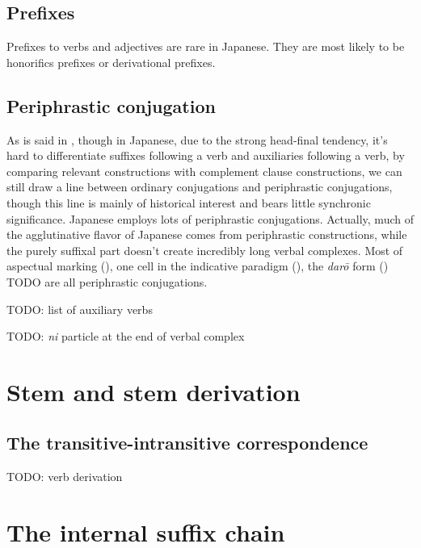 \documentclass[UTF8, a4paper, oneside, scheme=plain]{ctexrep}
\newcommand{\corpus}[1]{\emph{#1}}
\begin{document}
\subsection{Prefixes}\label{sec:prefixes}

Prefixes to verbs and adjectives are rare in Japanese.
They are most likely to be honorifics prefixes or derivational prefixes.

\subsection{Periphrastic conjugation}\label{sec:periphrastic}

As is said in ,
though in Japanese, 
due to the strong head-final tendency,
it's hard to differentiate
suffixes following a verb and auxiliaries following a verb,
by comparing relevant constructions with complement clause constructions, 
we can still draw a line between ordinary conjugations and periphrastic conjugations,
though this line is mainly of historical interest and bears little synchronic significance.
Japanese employs lots of periphrastic conjugations.
Actually, much of the agglutinative flavor of Japanese comes from periphrastic constructions,
while the purely suffixal part doesn't create incredibly long verbal complexes.
Most of aspectual marking (), 
one cell in the indicative paradigm (), 
the \corpus{{dar\={o}}} form () TODO 
are all periphrastic conjugations.

TODO: list of auxiliary verbs

TODO: \corpus{ni} particle at the end of verbal complex

\section{Stem and stem derivation}\label{sec:verb-stem}

\subsection{The transitive-intransitive correspondence}

TODO: verb derivation

\section{The internal suffix chain}\label{sec:internal-suffix-chain}
\end{document}
